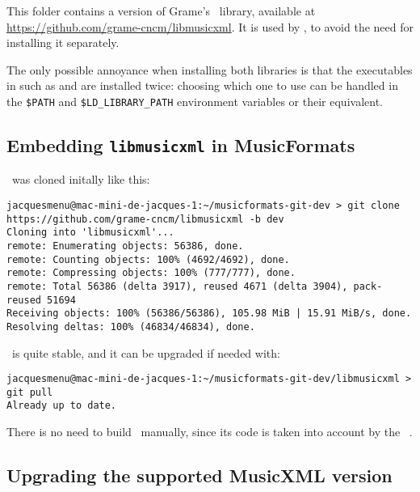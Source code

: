This folder contains a version of Grame's \libmusicxml\ library, available at \url{https://github.com/grame-cncm/libmusicxml}. It is used by \mf, to avoid the need for installing it separately.

The only possible annoyance when installing both libraries is that the executables in  such as  and  are installed twice: choosing which one to use can be handled in the {\tt \$\textbraceleft PATH\textbraceright} and {\tt \$\textbraceleft LD_LIBRARY_PATH\textbraceright} environment variables or their equivalent.


\subsection{Embedding {\tt libmusicxml} in MusicFormats}

\libmusicxml\ was cloned initally like this:
 \begin{lstlisting}[language=Terminal]
jacquesmenu@mac-mini-de-jacques-1:~/musicformats-git-dev > git clone https://github.com/grame-cncm/libmusicxml -b dev
Cloning into 'libmusicxml'...
remote: Enumerating objects: 56386, done.
remote: Counting objects: 100% (4692/4692), done.
remote: Compressing objects: 100% (777/777), done.
remote: Total 56386 (delta 3917), reused 4671 (delta 3904), pack-reused 51694
Receiving objects: 100% (56386/56386), 105.98 MiB | 15.91 MiB/s, done.
Resolving deltas: 100% (46834/46834), done.
\end{lstlisting}

 \libmusicxml\ is quite stable, and it can be upgraded if needed with:
 \begin{lstlisting}[language=Terminal]
jacquesmenu@mac-mini-de-jacques-1:~/musicformats-git-dev/libmusicxml > git pull
Already up to date.
\end{lstlisting}

There is no need to build \libmusicxml\ manually, since its code is taken into account by the \mf\ \Makefile.


\subsection{Upgrading the supported MusicXML version}

